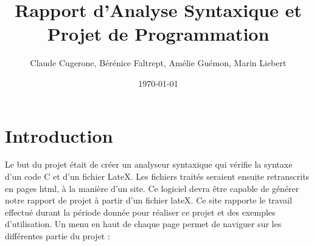 \documentclass[10pt,a4paper]{report}
\date{\today}
\begin{document}
\title{Rapport d'Analyse Syntaxique et Projet de Programmation}

\author{Claude Cugerone, Bérénice Faltrept, Amélie Guémon, Marin Liebert}

\tableofcontents

\section{Introduction}

Le but du projet était de créer un analyseur syntaxique qui vérifie la syntaxe d'un code C et d'un fichier LateX. Les fichiers traités seraient ensuite retranscrits en pages html, à la manière d'un site. Ce logiciel devra être capable de générer notre rapport de projet à partir d'un fichier lateX.
Ce site rapporte le travail effectué durant la période donnée pour réaliser ce projet et des exemples d'utilisation. 
Un menu en haut de chaque page permet de naviguer sur les différentes partie du projet :
\end{document}
